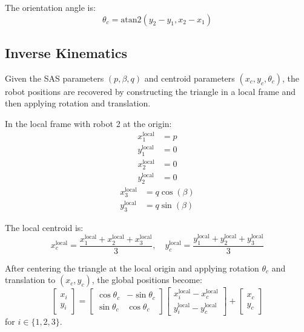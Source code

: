 \documentclass[lettersize,journal]{IEEEtran}
\begin{document}
The orientation angle is:
\begin{equation}
\theta_c = \text{atan2}(y_2 - y_1, x_2 - x_1)
\end{equation}

\subsection{Inverse Kinematics}

Given the SAS parameters $(p, \beta, q)$ and centroid parameters $(x_c, y_c, \theta_c)$, the robot positions are recovered by constructing the triangle in a local frame and then applying rotation and translation.

In the local frame with robot 2 at the origin:
\begin{equation}
\begin{aligned}
x_1^{\text{local}} &= p \\
y_1^{\text{local}} &= 0
\end{aligned}
\end{equation}
\begin{equation}
\begin{aligned}
x_2^{\text{local}} &= 0 \\
y_2^{\text{local}} &= 0
\end{aligned}
\end{equation}
\begin{equation}
\begin{aligned}
x_3^{\text{local}} &= q\cos(\beta) \\
y_3^{\text{local}} &= q\sin(\beta)
\end{aligned}
\end{equation}

The local centroid is:
\begin{equation}
x_c^{\text{local}} = \frac{x_1^{\text{local}} + x_2^{\text{local}} + x_3^{\text{local}}}{3}, \quad y_c^{\text{local}} = \frac{y_1^{\text{local}} + y_2^{\text{local}} + y_3^{\text{local}}}{3}
\end{equation}

After centering the triangle at the local origin and applying rotation $\theta_c$ and translation to $(x_c, y_c)$, the global positions become:
\begin{equation}
\begin{bmatrix} x_i \\ y_i \end{bmatrix} = \begin{bmatrix} \cos\theta_c & -\sin\theta_c \\ \sin\theta_c & \cos\theta_c \end{bmatrix} \begin{bmatrix} x_i^{\text{local}} - x_c^{\text{local}} \\ y_i^{\text{local}} - y_c^{\text{local}} \end{bmatrix} + \begin{bmatrix} x_c \\ y_c \end{bmatrix}
\end{equation}
for $i \in \{1, 2, 3\}$.
\end{document}
